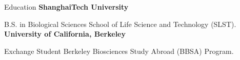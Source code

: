 \begin{rubric}{Education}
\entry*[2023 -- 2027]%
	\textbf{ShanghaiTech University}\par
	B.S. in Biological Sciences \textperiodcentered{} School of Life Science and Technology (SLST).
%
\entry*[Spring 2026]%
	\textbf{University of California, Berkeley}\par
	Exchange Student \textperiodcentered{} Berkeley Biosciences Study Abroad (BBSA) Program.
\end{rubric}